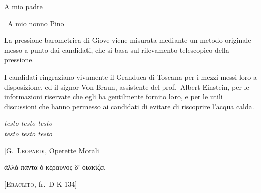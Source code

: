 \documentclass[%
12pt,
twoside,
]{toptesi}
\begin{document}
\ifclassica
    \tomo
    \paginavuota%
    \begin{dedica}
        A mio padre

        \textdagger\ A mio nonno Pino
    \end{dedica}
\else
    \frontespizio*
\fi


\sommario%

La pressione barometrica di Giove viene misurata
mediante un metodo originale  messo a punto dai candidati, che si basa
sul rilevamento telescopico della pressione.

\ringraziamenti%

I candidati ringraziano vivamente il Granduca di Toscana per i mezzi
messi loro a disposizione, ed il signor Von Braun, assistente del
prof.~Albert Einstein, per le informazioni riservate che egli ha
gentilmente fornito loro, e per le utili discussioni che hanno permesso
ai candidati di evitare di riscoprire l'acqua calda.

\tablespagetrue\figurespagetrue %
\indici%

    \begin{citazioni}
        \textit{testo testo testo\\testo testo testo}

        [\textsc{G.\ Leopardi}, Operette Morali]

        \begin{greek}
        ἀλλὰ πάντα ὁ κέραυνος δ' ὀιακίζει
        \end{greek}

        [\textsc{Eraclito}, fr.\ D-K 134]
    \end{citazioni}


\mainmatter
\end{document}

